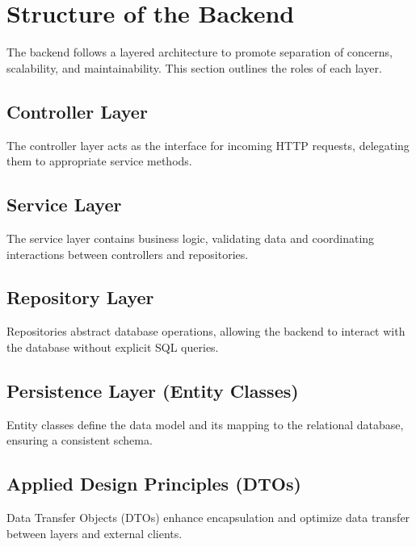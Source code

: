 \Author{\daAuthorThree}


    \section{Structure of the Backend}
    The backend follows a layered architecture to promote separation of concerns, scalability, and maintainability. This section outlines the roles of each layer.

    \subsection{Controller Layer}
    The controller layer acts as the interface for incoming HTTP requests, delegating them to appropriate service methods.

    \subsection{Service Layer}
    The service layer contains business logic, validating data and coordinating interactions between controllers and repositories.

    \subsection{Repository Layer}
    Repositories abstract database operations, allowing the backend to interact with the database without explicit SQL queries.

    \subsection{Persistence Layer (Entity Classes)}
    Entity classes define the data model and its mapping to the relational database, ensuring a consistent schema.

    \subsection{Applied Design Principles (DTOs)}
    Data Transfer Objects (DTOs) enhance encapsulation and optimize data transfer between layers and external clients.
